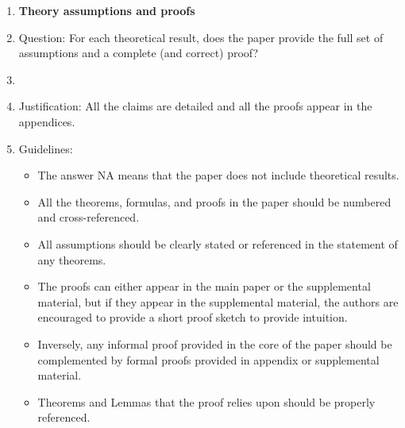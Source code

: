 \documentclass{article}
\theoremstyle{plain}
\theoremstyle{definition}
\begin{document}
\begin{enumerate}
\item {\bf Theory assumptions and proofs}
    \item[] Question: For each theoretical result, does the paper provide the full set of assumptions and a complete (and correct) proof?
    \item[] \answerYes{}
    \item[] Justification: All the claims are detailed and all the proofs appear in the appendices.
    \item[] Guidelines:
    \begin{itemize}
        \item The answer NA means that the paper does not include theoretical results. 
        \item All the theorems, formulas, and proofs in the paper should be numbered and cross-referenced.
        \item All assumptions should be clearly stated or referenced in the statement of any theorems.
        \item The proofs can either appear in the main paper or the supplemental material, but if they appear in the supplemental material, the authors are encouraged to provide a short proof sketch to provide intuition. 
        \item Inversely, any informal proof provided in the core of the paper should be complemented by formal proofs provided in appendix or supplemental material.
        \item Theorems and Lemmas that the proof relies upon should be properly referenced. 
    \end{itemize}


\end{enumerate}
\end{document}
